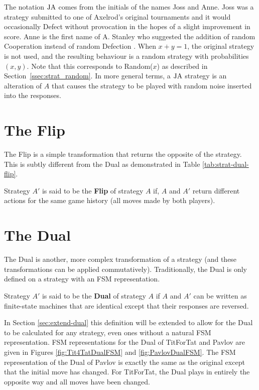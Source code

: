 The notation $\text{JA}$ comes from the initials of the names Joss and Anne.
Joss was a strategy submitted to one of Axelrod’s original tournaments and it would occasionally Defect without provocation in the hopes of a slight improvement in score.
Anne is the first name of A. Stanley who suggested the addition of random Cooperation instead of random Defection \cite{Ashlock2008}.
When $x + y = 1$, the original strategy is not used, and the resulting behaviour
is a random strategy with probabilities $(x, y)$. Note that this corresponds to
Random($x$) as described in Section~\ref{ssec:strat_random}.
In more general terms, a $\text{JA}$ strategy is an alteration of $A$ that causes the strategy to be played with random noise inserted into the responses.



\section{The Flip}\label{sec:flip}
The Flip is a simple transformation that returns the opposite of the strategy.
This is subtly different from the Dual as demonstrated in Table \ref{tab:strat-dual-flip}.

\begin{definition}\label{def:flip}
Strategy $A'$ is said to be the \textbf{Flip} of strategy $A$ if, $A$ and $A'$ return different actions for the same game history (all moves made by both players).
\end{definition}



\section{The Dual}\label{sec:dual}
The Dual is another, more complex transformation of a strategy \cite{Ashlock2008, Ashlock2010, Ashlock2004,  Ashlock2005, Ashlock2009, Ashlock2006} (and these transformations can be applied commutatively).
Traditionally, the Dual is only defined on a strategy with an FSM representation.

\begin{definition}\label{def:dual}
Strategy $A'$ is said to be the \textbf{Dual} of strategy $A$ if $A$ and $A'$ can be written as finite-state machines that are identical except that their responses are reversed.
\end{definition}

In Section \ref{sec:extend-dual} this definition will be extended to allow for the Dual to be calculated for any strategy, even ones without a natural FSM representation.
FSM representations for the Dual of TitForTat and Pavlov are given in Figures \ref{fig:Tit4TatDualFSM} and \ref{fig:PavlovDualFSM}.
The FSM representation of the Dual of Pavlov is exactly the same as the original except that the initial move has changed.
For TitForTat, the Dual plays in entirely the opposite way and all moves have been changed.

